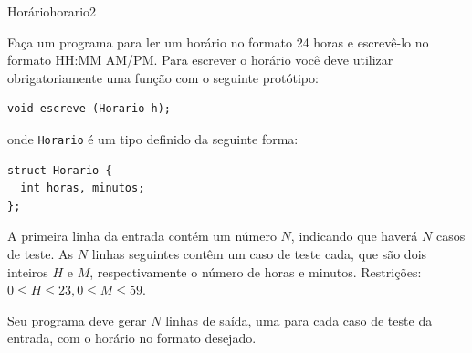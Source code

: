 \documentclass[12pt,a4paper,oneside]{article}
\begin{document}
\begin{problem}{Horário}{horario}{2}
 
Faça um programa para ler um horário no formato 24 horas e escrevê-lo no formato HH:MM AM/PM. Para escrever o horário você deve utilizar obrigatoriamente uma função com o seguinte protótipo:

\begin{lstlisting}
void escreve (Horario h);
\end{lstlisting}

onde \texttt{Horario} é um tipo definido da seguinte forma:

\begin{lstlisting}
struct Horario {
  int horas, minutos;
};
\end{lstlisting}


%

\InputFile

A primeira linha da entrada contém um número $N$, indicando que haverá $N$ casos de teste. As $N$ linhas seguintes contêm um caso de teste cada, que são dois inteiros $H$ e $M$, respectivamente o número de horas e minutos. Restrições: $0 \leq H \leq 23, 0 \leq M \leq 59$.

\OutputFile

Seu programa deve gerar $N$ linhas de saída, uma para cada caso de teste da entrada, com o horário no formato desejado.


\Example

\begin{example}
%
\end{example}




\end{problem}
\end{document}

